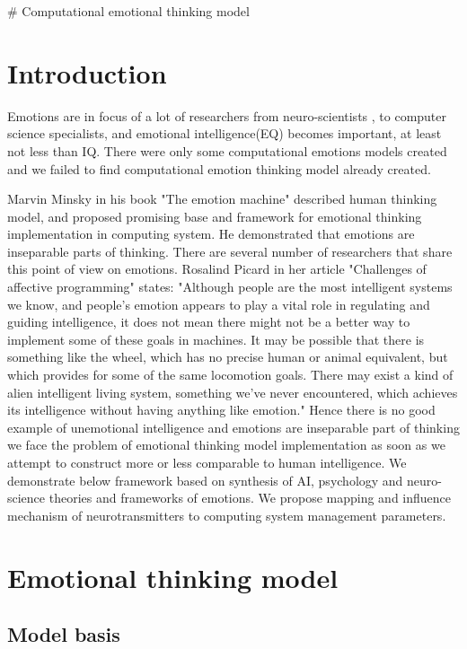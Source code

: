 # Computational emotional thinking model

\section{Introduction}

Emotions are in focus of a lot of researchers from neuro-scientists \cite{}, to computer science specialists\cite{}, and emotional intelligence(EQ) becomes important, at least not less than IQ.
There were only some computational emotions models created\cite{computationalmodelsemotion, computationalmodelsemotionscognition, evaluatingcomutationalmodel} and we failed to find computational emotion thinking model already created.

Marvin Minsky in his book "The emotion machine"\cite{emotionmachine} described human thinking model, and proposed promising base and framework for emotional thinking implementation in computing system. He demonstrated that emotions are inseparable parts of thinking. There are several number of researchers that share this point of view on emotions. Rosalind Picard in her article\cite{affectivecomputingchallanges} "Challenges of affective programming" states: "Although people are the most intelligent systems we know, and people’s emotion appears to play a vital role in regulating and guiding intelligence, it does not mean there might not be a better way to implement some of these goals in machines. It may be possible that there is something like the wheel, which has no precise human or animal equivalent, but which provides for some of the same locomotion goals. There may exist a kind of alien intelligent living system, something we’ve never encountered, which achieves its intelligence without having anything like emotion."  Hence there is no good example of unemotional intelligence and emotions are inseparable part of thinking we face the problem of emotional thinking model implementation as soon as we attempt to construct more or less comparable to human intelligence. We demonstrate below framework based on synthesis of AI, psychology and neuro-science theories and frameworks of emotions. We propose mapping and influence mechanism of neurotransmitters to computing system management parameters.

\section{Emotional thinking model}

\subsection{Model basis}

